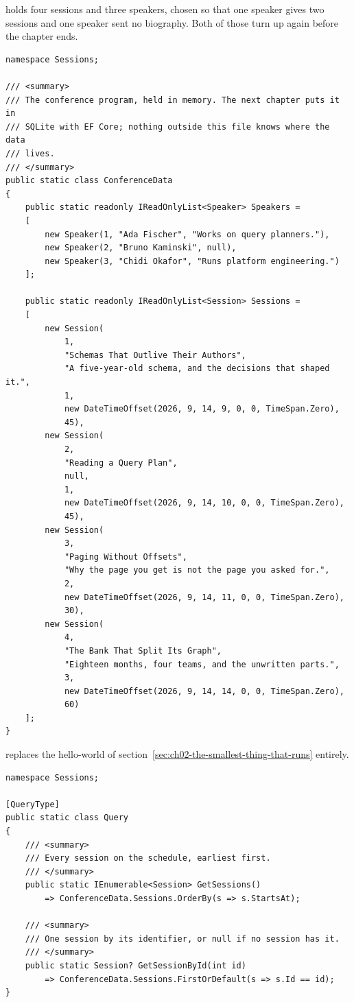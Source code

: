  holds four sessions and three speakers, chosen so that
one speaker gives two sessions and one speaker sent no biography. Both of those
turn up again before the chapter ends.

\begin{verbatim}
namespace Sessions;

/// <summary>
/// The conference program, held in memory. The next chapter puts it in
/// SQLite with EF Core; nothing outside this file knows where the data
/// lives.
/// </summary>
public static class ConferenceData
{
    public static readonly IReadOnlyList<Speaker> Speakers =
    [
        new Speaker(1, "Ada Fischer", "Works on query planners."),
        new Speaker(2, "Bruno Kaminski", null),
        new Speaker(3, "Chidi Okafor", "Runs platform engineering.")
    ];

    public static readonly IReadOnlyList<Session> Sessions =
    [
        new Session(
            1,
            "Schemas That Outlive Their Authors",
            "A five-year-old schema, and the decisions that shaped it.",
            1,
            new DateTimeOffset(2026, 9, 14, 9, 0, 0, TimeSpan.Zero),
            45),
        new Session(
            2,
            "Reading a Query Plan",
            null,
            1,
            new DateTimeOffset(2026, 9, 14, 10, 0, 0, TimeSpan.Zero),
            45),
        new Session(
            3,
            "Paging Without Offsets",
            "Why the page you get is not the page you asked for.",
            2,
            new DateTimeOffset(2026, 9, 14, 11, 0, 0, TimeSpan.Zero),
            30),
        new Session(
            4,
            "The Bank That Split Its Graph",
            "Eighteen months, four teams, and the unwritten parts.",
            3,
            new DateTimeOffset(2026, 9, 14, 14, 0, 0, TimeSpan.Zero),
            60)
    ];
}
\end{verbatim}

 replaces the hello-world of
section~\ref{sec:ch02-the-smallest-thing-that-runs} entirely.

\begin{verbatim}
namespace Sessions;

[QueryType]
public static class Query
{
    /// <summary>
    /// Every session on the schedule, earliest first.
    /// </summary>
    public static IEnumerable<Session> GetSessions()
        => ConferenceData.Sessions.OrderBy(s => s.StartsAt);

    /// <summary>
    /// One session by its identifier, or null if no session has it.
    /// </summary>
    public static Session? GetSessionById(int id)
        => ConferenceData.Sessions.FirstOrDefault(s => s.Id == id);
}
\end{verbatim}


